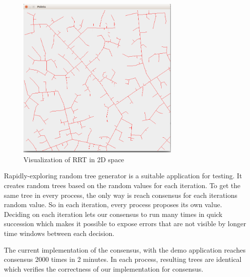 \documentclass[times, 12pt,twocolumn]{article}
\begin{document}
\begin{figure}[ht!]
\centering
\includegraphics[width=80mm]{rrt.png}
\caption{Visualization of RRT in 2D space}
\label{fig:rrt}
\end{figure}

Rapidly-exploring random tree generator is a suitable application for testing. It creates random trees based on the random values for each iteration. To get the same tree in every process, the only way is reach consensus for each iterations random value. So in each iteration, every process proposes its own value. Deciding on each iteration lets our consensus to run many times in quick succession which makes it possible to expose errors that are not visible by longer time windows between each decision.
 


The current implementation of the consensus, with the demo application reaches consensus 2000 times in 2 minutes. In each process, resulting trees are identical which verifies the correctness of our implementation for consensus. %




\end{document}
